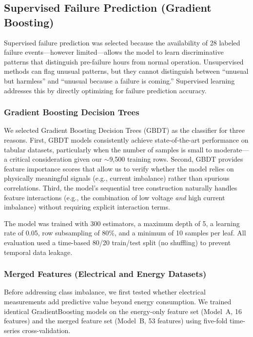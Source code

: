 \documentclass{article}
\begin{document}
\subsection{Supervised Failure Prediction (Gradient Boosting)}

Supervised failure prediction was selected because the availability of 28 labeled failure events---however limited---allows the model to learn discriminative patterns that distinguish pre-failure hours from normal operation. Unsupervised methods can flag unusual patterns, but they cannot distinguish between ``unusual but harmless'' and ``unusual because a failure is coming.'' Supervised learning addresses this by directly optimizing for failure prediction accuracy.

\subsubsection{Gradient Boosting Decision Trees}

We selected Gradient Boosting Decision Trees (GBDT) as the classifier for three reasons. First, GBDT models consistently achieve state-of-the-art performance on tabular datasets, particularly when the number of samples is small to moderate---a critical consideration given our $\sim$9,500 training rows. Second, GBDT provides feature importance scores that allow us to verify whether the model relies on physically meaningful signals (e.g., current imbalance) rather than spurious correlations. Third, the model's sequential tree construction naturally handles feature interactions (e.g., the combination of low voltage \textit{and} high current imbalance) without requiring explicit interaction terms.

The model was trained with 300 estimators, a maximum depth of 5, a learning rate of 0.05, row subsampling of 80\%, and a minimum of 10 samples per leaf. All evaluation used a time-based 80/20 train/test split (no shuffling) to prevent temporal data leakage.

\subsubsection{Merged Features (Electrical and Energy Datasets)}

Before addressing class imbalance, we first tested whether electrical measurements add predictive value beyond energy consumption. We trained identical GradientBoosting models on the energy-only feature set (Model~A, 16 features) and the merged feature set (Model~B, 53 features) using five-fold time-series cross-validation.
\end{document}
